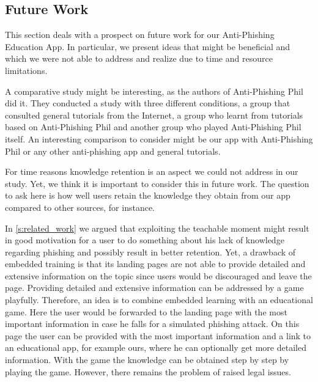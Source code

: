 \subsection{Future Work}
This section deals with a prospect on future work for our Anti-Phishing Education App.
 In particular, we present ideas that might be beneficial and which we were not able to address and realize due to time and resource limitations.

\begin{description}[leftmargin=0cm]
	\item[Comparative Study] A comparative study might be interesting, as the authors of Anti-Phishing Phil~\cite{sheng2007antiphishingphil} did it.
	They conducted a study with three different conditions,  a group that consulted general tutorials from the Internet, a  group who learnt from tutorials based on Anti-Phishing Phil and another group who played Anti-Phishing Phil itself.
	An interesting comparison to consider might be our app with Anti-Phishing Phil or any other anti-phishing app and general tutorials.
	\item[Study on Retention] For time reasons knowledge retention is an aspect we could not address in our study.
	Yet, we think it is important to consider this in future work.
	The question to ask here is how well users retain the knowledge they obtain from our app compared to other sources, for instance.
	\item[Embedded Training] In \autoref{s:related_work} we argued that exploiting the teachable moment might result in good motivation for a user to do something about his lack of knowledge regarding phishing and possibly result in better retention.
	Yet, a drawback of embedded training is that its landing pages are not able to provide detailed and extensive information on the topic since users would be discouraged and leave the page.
	Providing detailed and extensive information can be addressed by a game playfully.
	Therefore, an idea is to combine embedded learning with an educational game.
	Here the user would be forwarded to the landing page with the most important information in case he falls for a simulated phishing attack.
	On this page the user can be provided with the most important information and a link to an educational app, for example ours, where he can optionally get more detailed information.
	With the game the knowledge can be obtained step by step by playing the game.
However, there remains the problem of raised legal issues.

\end{description}
